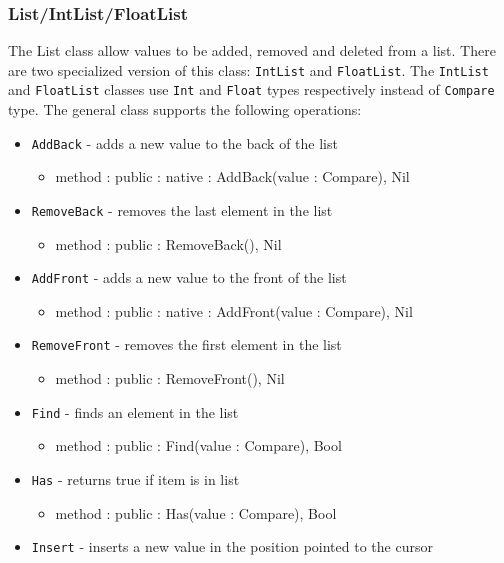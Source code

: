 \documentclass[12pt]{article}
\begin{document}
\subsubsection{List/IntList/FloatList}
The List class allow values to be added, removed and deleted from a list.  There are two specialized version of this class: \texttt{IntList} and \texttt{FloatList}.  The \texttt{IntList} and \texttt{FloatList} classes use \texttt{Int} and \texttt{Float} types respectively instead of \texttt{Compare} type.  The general class supports the following operations:
\begin{itemize}
    \item \texttt{AddBack} - adds a new value to the back of the list
    	\begin{itemize}
	\item method : public : native : AddBack(value : Compare), Nil
	\end{itemize}
    \item \texttt{RemoveBack} - removes the last element in the list
    	\begin{itemize}
	\item method : public : RemoveBack(), Nil
	\end{itemize}
    \item \texttt{AddFront} - adds a new value to the front of the list
    	\begin{itemize}
	\item method : public : native : AddFront(value : Compare), Nil
	\end{itemize}
    \item \texttt{RemoveFront} - removes the first element in the list
    	\begin{itemize}
	\item method : public : RemoveFront(), Nil
	\end{itemize}
    \item \texttt{Find} - finds an element in the list
    	\begin{itemize}
	\item method : public : Find(value : Compare), Bool
	\end{itemize}
    \item \texttt{Has} - returns true if item is in list
    	\begin{itemize}
	\item method : public : Has(value : Compare), Bool
	\end{itemize}
    \item \texttt{Insert} - inserts a new value in the position pointed to the cursor

\end{itemize}
\end{document}
